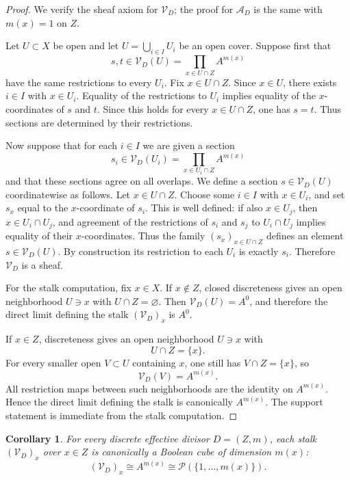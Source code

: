 \documentclass[11pt,a4paper]{article}
\newtheorem{corollary}[theorem]{Corollary}
\theoremstyle{definition}
\theoremstyle{remark}
\newcommand{\cP}{\mathcal P}
\begin{document}
\begin{proof}
We verify the sheaf axiom for \(\mathcal V_D\); the proof for \(\mathcal A_D\) is the same with \(m(x)=1\) on \(Z\).

Let \(U\subset X\) be open and let \(U=\bigcup_{i\in I}U_i\) be an open cover. Suppose first that
\[
s,t\in\mathcal V_D(U)=\prod_{x\in U\cap Z}A^{m(x)}
\]
have the same restrictions to every \(U_i\). Fix \(x\in U\cap Z\). Since \(x\in U\), there exists \(i\in I\) with \(x\in U_i\). Equality of the restrictions to \(U_i\) implies equality of the \(x\)-coordinates of \(s\) and \(t\). Since this holds for every \(x\in U\cap Z\), one has \(s=t\). Thus sections are determined by their restrictions.

Now suppose that for each \(i\in I\) we are given a section
\[
s_i\in\mathcal V_D(U_i)=\prod_{x\in U_i\cap Z}A^{m(x)}
\]
and that these sections agree on all overlaps. We define a section \(s\in\mathcal V_D(U)\) coordinatewise as follows. Let \(x\in U\cap Z\). Choose some \(i\in I\) with \(x\in U_i\), and set \(s_x\) equal to the \(x\)-coordinate of \(s_i\). This is well defined: if also \(x\in U_j\), then \(x\in U_i\cap U_j\), and agreement of the restrictions of \(s_i\) and \(s_j\) to \(U_i\cap U_j\) implies equality of their \(x\)-coordinates. Thus the family \((s_x)_{x\in U\cap Z}\) defines an element \(s\in\mathcal V_D(U)\). By construction its restriction to each \(U_i\) is exactly \(s_i\). Therefore \(\mathcal V_D\) is a sheaf.

For the stalk computation, fix \(x\in X\). If \(x\notin Z\), closed discreteness gives an open neighborhood \(U\ni x\) with \(U\cap Z=\varnothing\). Then \(\mathcal V_D(U)=A^0\), and therefore the direct limit defining the stalk \((\mathcal V_D)_x\) is \(A^0\).

If \(x\in Z\), discreteness gives an open neighborhood \(U\ni x\) with
\[
U\cap Z=\{x\}.
\]
For every smaller open \(V\subset U\) containing \(x\), one still has \(V\cap Z=\{x\}\), so
\[
\mathcal V_D(V)=A^{m(x)}.
\]
All restriction maps between such neighborhoods are the identity on \(A^{m(x)}\). Hence the direct limit defining the stalk is canonically \(A^{m(x)}\).
The support statement is immediate from the stalk computation.
\end{proof}

\begin{corollary}
For every discrete effective divisor \(D=(Z,m)\), each stalk \((\mathcal V_D)_x\) over \(x\in Z\) is canonically a Boolean cube of dimension \(m(x)\):
\[
(\mathcal V_D)_x\cong A^{m(x)}\cong \cP(\{1,\dots,m(x)\}).
\]
\end{corollary}
\end{document}
